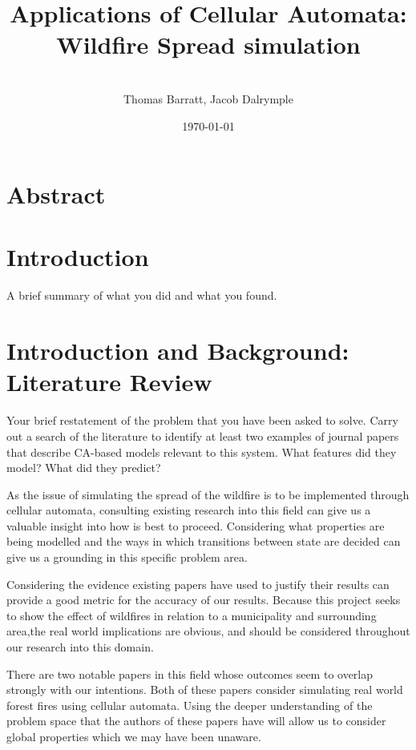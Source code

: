 \documentclass[11pt, a4paper, titlepage]{article}
\date{}
\title{ \textbf{Applications of Cellular Automata: Wildfire Spread simulation} \\  }
\author{\\ \Large{Thomas Barratt, Jacob Dalrymple  } }
\date{\today}
\begin{document}
\maketitle

\newpage

\section{Abstract}

\section{Introduction}

\begin{displayquote}
  A brief summary of what you did and what you found.
\end{displayquote}

\section{Introduction and Background: Literature Review}
\begin{displayquote}
  Your brief restatement of the problem
  that you have been asked to solve. Carry out a search of the literature to identify at least two
  examples of journal papers that describe CA-based models relevant to this system. What features
  did they model? What did they predict?
  
\end{displayquote}
  
  As the issue of simulating the spread of the wildfire is to be implemented through cellular automata, consulting existing research into this field can give us a valuable insight into how is best to proceed. Considering what properties are being modelled and the ways in which transitions between state are decided can give us a grounding in this specific problem area.

  Considering the evidence existing papers have used to justify their results can provide a good metric for the accuracy of our results. Because this project seeks to show the effect of wildfires in relation to a municipality and surrounding area,the real world implications are obvious, and should be considered throughout our research into this domain.

  There are two notable papers in this field whose outcomes seem to overlap strongly with our intentions. Both of these papers consider simulating real world forest fires using cellular automata. Using the deeper understanding of the problem space that the authors of these papers have will allow us to consider global properties which we may have been unaware.
\end{document}
